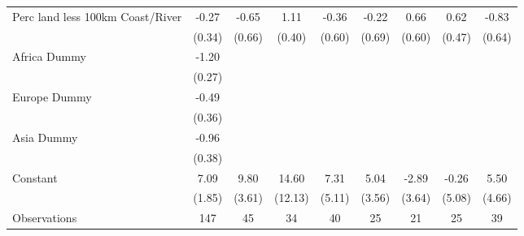 {\begin{tabular}{l*{8}{c}}
\addlinespace
Perc land less 100km Coast/River&       -0.27         &       -0.65         &        1.11\sym{**} &       -0.36         &       -0.22         &        0.66         &        0.62         &       -0.83         \\
                    &      (0.34)         &      (0.66)         &      (0.40)         &      (0.60)         &      (0.69)         &      (0.60)         &      (0.47)         &      (0.64)         \\
\addlinespace
Africa Dummy        &       -1.20\sym{***}&                     &                     &                     &                     &                     &                     &                     \\
                    &      (0.27)         &                     &                     &                     &                     &                     &                     &                     \\
\addlinespace
Europe Dummy        &       -0.49         &                     &                     &                     &                     &                     &                     &                     \\
                    &      (0.36)         &                     &                     &                     &                     &                     &                     &                     \\
\addlinespace
Asia Dummy          &       -0.96\sym{*}  &                     &                     &                     &                     &                     &                     &                     \\
                    &      (0.38)         &                     &                     &                     &                     &                     &                     &                     \\
\addlinespace
Constant            &        7.09\sym{***}&        9.80\sym{**} &       14.60         &        7.31         &        5.04         &       -2.89         &       -0.26         &        5.50         \\
                    &      (1.85)         &      (3.61)         &     (12.13)         &      (5.11)         &      (3.56)         &      (3.64)         &      (5.08)         &      (4.66)         \\
\midrule
Observations        &         147         &          45         &          34         &          40         &          25         &          21         &          25         &          39         \\

\end{tabular}}
